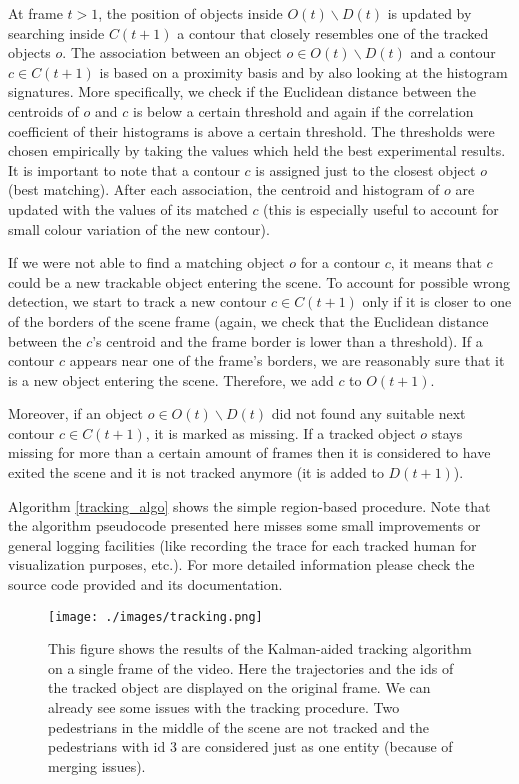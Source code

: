 \documentclass[runningheads]{llncs}
\begin{document}
At frame $t>1$, the position of objects inside $O(t)\backslash D(t)$ is updated by searching inside $C(t+1)$ a contour that closely resembles one of the tracked objects $o$. The association between an object $o \in O(t)\backslash D(t)$ and a contour $c \in C(t+1)$ is based on a proximity basis and by also looking at the histogram signatures. More specifically, we check if the Euclidean distance between the centroids of $o$ and $c$ is below a certain threshold and again if the correlation coefficient of their histograms is above a certain threshold. The thresholds were chosen empirically by taking the values which held the best experimental results. It is important to note that a contour $c$ is assigned just to the closest object $o$ (best matching). After each association, the centroid and histogram of $o$ are updated with the values of its matched $c$ (this is especially useful to account for small colour variation of the new contour).
\smallskip

If we were not able to find a matching object $o$ for a contour $c$, it means that $c$ could be a new trackable object entering the scene. To account for possible wrong detection, we start to track a new contour $c \in C(t+1)$ only if it is closer to one of the borders of the scene frame (again, we check that the Euclidean distance between the $c$'s centroid and the frame border is lower than a threshold). If a contour $c$ appears near one of the frame's borders, we are reasonably sure that it is a new object entering the scene. Therefore, we add $c$ to $O(t+1)$.
\smallskip

Moreover, if an object $o \in O(t)\backslash D(t)$ did not found any suitable next contour $c \in C(t+1)$, it is marked as missing. If a tracked object $o$ stays missing for more than a certain amount of frames then it is considered to have exited the scene and it is not tracked anymore (it is added to $D(t+1)$).
\smallskip

Algorithm \ref{tracking_algo} shows the simple region-based procedure. Note that the algorithm pseudocode presented here misses some small improvements or general logging facilities (like recording the trace for each tracked human for visualization purposes, etc.).
For more detailed information please check the source code provided and its documentation.

\begin{figure}[t]
\texttt{[image: ./images/tracking.png]}
\caption{This figure shows the results of the Kalman-aided tracking algorithm on a single frame of the video. Here the trajectories and the ids of the tracked object are displayed on the original frame. We can already see some issues with the tracking procedure. Two pedestrians in the middle of the scene are not tracked and the pedestrians with id 3 are considered just as one entity (because of merging issues).}
\label{tracking}
\end{figure}
\end{document}
